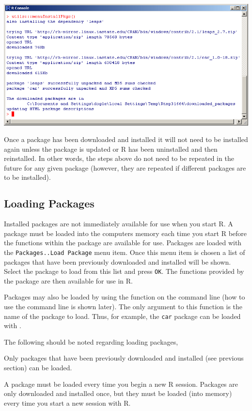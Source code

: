 \documentclass[a4paper]{article}
\begin{document}
\begin{center}
  \includegraphics[width=5.5in]{Figs/Install_Pkg_2.jpg}
\end{center}

Once a package has been downloaded and installed it will not need to be installed again unless the package is updated or R has been uninstalled and then reinstalled.  In other words, the steps above do not need to be repeated in the future for any given package (however, they are repeated if different packages are to be installed).

\subsection{Loading Packages}  \label{sect:RPkgLoad}
Installed packages are not immediately available for use when you start R.  A package must be loaded into the computers memory each time you start R before the functions within the package are available for use.  Packages are loaded with the \verb"Packages..Load Package" menu item.  Once this menu item is chosen a list of packages that have been previously downloaded and installed will be shown.  Select the package to load from this list and press \verb"OK".  The functions provided by the package are then available for use in R.

Packages may also be loaded by using the  function on the command line (how to use the command line is shown later).  The only argument to this function is the name of the package to load.  Thus, for example, the \verb"car" package can be loaded with .

The following should be noted regarding loading packages,
\begin{Itemize}
  \item Only packages that have been previously downloaded and installed (see previous section) can be loaded.
  \item A package must be loaded every time you begin a new R session.  Packages are only downloaded and installed once, but they must be loaded (into memory) every time you start a new session with R.
\end{Itemize}
\end{document}
